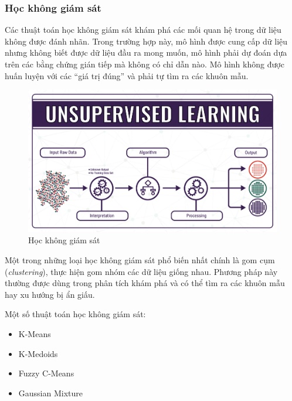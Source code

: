 \subsubsection{Học không giám sát}
Các thuật toán học không giám sát khám phá các mối quan hệ trong dữ liệu không được đánh nhãn. Trong trường hợp này, mô hình được cung cấp dữ liệu nhưng không biết được dữ liệu đầu ra mong muốn, mô hình phải dự đoán dựa trên các bằng chứng gián tiếp mà không có chỉ dẫn nào. Mô hình không được huấn luyện với các ``giá trị đúng'' và phải tự tìm ra các khuôn mẫu.\cite{webpage}
\begin{figure}[htb]
    \centering
    \includegraphics[width=\textwidth]{image/unsupervised-learning.png}
    \caption{Học không giám sát}
    \label{figure:unsupervised-learning}
\end{figure}

Một trong những loại học không giám sát phổ biến nhất chính là gom cụm (\textit{clustering}), thực hiện gom nhóm các dữ liệu giống nhau. Phương pháp này thường được dùng trong phân tích khám phá và có thể tìm ra các khuôn mẫu hay xu hướng bị ẩn giấu.

Một số thuật toán học không giám sát:
\begin{itemize}
    \item K-Means
    \item K-Medoids
    \item Fuzzy C-Means
    \item Gaussian Mixture
\end{itemize}

